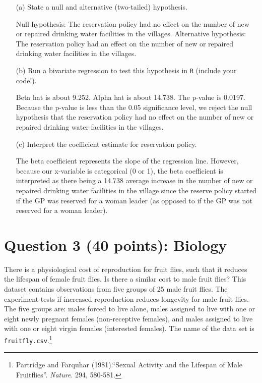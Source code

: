 \documentclass[12pt,letterpaper]{article}
\begin{document}
\newpage
\begin{enumerate}
	\item [(a)] State a null and alternative (two-tailed) hypothesis.
\vspace{1cm}
 
\noindent Null hypothesis: The reservation policy had no effect on the number of new or repaired drinking water facilities in the villages. Alternative hypothesis: The reservation policy had an effect on the number of new or repaired drinking water facilities in the villages.
	
	\vspace{2cm}
	\item [(b)] Run a bivariate regression to test this hypothesis in \texttt{R} (include your code!).
 
	\vspace{1cm}
\noindent Beta hat is about 9.252. Alpha hat is about 14.738. The p-value is 0.0197. Because the p-value is less than the 0.05 significance level, we reject the null hypothesis that the reservation policy had no effect on the number of new or repaired drinking water facilities in the villages. 
	
	\vspace{4cm}
	\item [(c)] Interpret the coefficient estimate for reservation policy. 
	\vspace{1cm}
	
\noindent The beta coefficient represents the slope of the regression line. However, because our x-variable is categorical (0 or 1), the beta coefficient is interpreted as there being a 14.738 average increase in the number of new or repaired drinking water facilities in the village since the reserve policy started if the GP was reserved for a woman leader (as opposed to if the GP was not reserved for a woman leader).
\end{enumerate}

\newpage
	\section*{Question 3 (40 points): Biology}

There is a physiological cost of reproduction for fruit flies, such that it reduces the lifespan of female fruit flies.  Is there a similar cost to male fruit flies?  This dataset contains observations from five groups of 25 male fruit flies. The experiment tests if increased reproduction reduces longevity for male fruit flies. The five groups are: males forced to live alone, males assigned to live with one or eight newly pregnant females (non-receptive females), and males assigned to live with one or eight virgin females (interested females). The name of the data set is \texttt{fruitfly.csv}.\footnote{Partridge and Farquhar (1981).``Sexual Activity and the Lifespan of Male Fruitflies''. \textit{Nature}. 294, 580-581.}
	\vspace{1cm}
\end{document}
